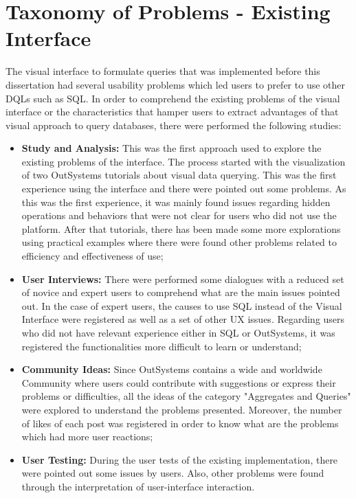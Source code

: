 \chapter{Taxonomy of Problems - Existing Interface}
\label{app:taxonomy_of_problems_existing_interface}

The visual interface to formulate queries that was implemented before this dissertation had several usability problems which led users to prefer to use other \glspl{DQL} such as SQL. In order to comprehend the existing problems of the visual interface or the characteristics that hamper users to extract advantages of that visual approach to query databases, there were performed the following studies:

\begin{itemize}
    \item \textbf{Study and Analysis:} This was the first approach used to explore the existing problems of the interface. The process started with the visualization of two OutSystems tutorials \cite{outsystems_tutorial_aggregates_101, outsystems_tutorial_advanced_aggregates} about visual data querying. This was the first experience using the interface and there were pointed out some problems. As this was the first experience, it was mainly found issues regarding hidden operations and behaviors that were not clear for users who did not use the platform. After that tutorials, there has been made some more explorations using practical examples where there were found other problems related to efficiency and effectiveness of use;
    \item \textbf{User Interviews:} There were performed some dialogues with a reduced set of novice and expert users to comprehend what are the main issues pointed out. In the case of expert users, the causes to use SQL instead of the Visual Interface were registered as well as a set of other \gls{UX} issues. Regarding users who did not have relevant experience either in SQL or OutSystems, it was registered the functionalities more difficult to learn or understand;
    \item \textbf{Community Ideas:} Since OutSystems contains a wide and worldwide Community where users could contribute with suggestions or express their problems or difficulties, all the ideas of the category "Aggregates and Queries" were explored to understand the problems presented. Moreover, the number of likes of each post was registered in order to know what are the problems which had more user reactions; 
    \item \textbf{User Testing:} During the user tests of the existing implementation, there were pointed out some issues by users. Also, other problems were found through the interpretation of user-interface interaction.
\end{itemize}

